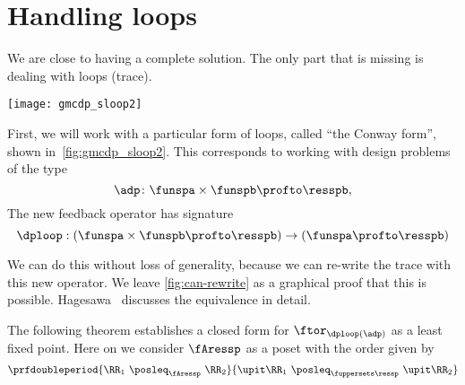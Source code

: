 
\section{Handling loops}

We are close to having a complete solution.
The only part that is missing is dealing with loops (trace).

\begin{marginfigure}
    \texttt{[image: gmcdp\_sloop2]}
    \caption{}
    \label{fig:gmcdp_sloop2}
\end{marginfigure}

First, we will work with a particular form of loops, called ``the Conway form'',
shown in~\cref{fig:gmcdp_sloop2}.
This corresponds to working with design problems of the type
\begin{equation}
    \adp \colon \funspa \times \funspb  \profto \resspb,
\end{equation}
The new feedback operator has signature
\begin{equation}
    \dploop: (\funspa \times \funspb \profto \resspb) \to (\funspa \profto \resspb)
\end{equation}

We can do this without loss of generality, because we can re-write the trace
with this new operator.
We leave \cref{fig:can-rewrite} as a graphical proof that this is possible.
Hagesawa~\cite{hasegawa02uniformity} discusses the equivalence in detail.

\begin{figure*}[h]
    \hspace*{\fill}
    \hspace*{\fill}
    \hspace*{\fill}
    \caption{We can rewrite the trace in Conway's form.}
    \label{fig:can-rewrite}
\end{figure*}

The following theorem establishes a closed form for $\ftor_{\dploop(\adp)}$
as a least fixed point.
Here on we consider $\fAressp$ as a poset with the order given by
\begin{equation}
    \prfdoubleperiod{
        \RR_1 \  \posleq_{\fAressp} \ \RR_2
    }{
        \upit \RR_1 \ \posleq_{\fuppersets \ressp}\  \upit \RR_2
    }
\end{equation}

